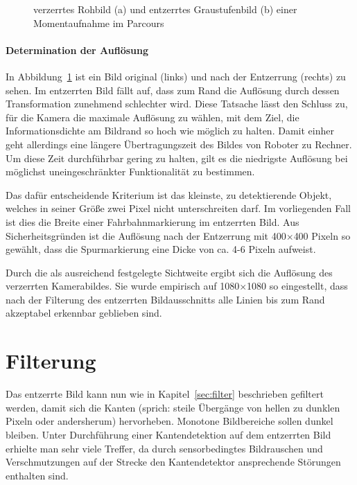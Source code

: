 \begin{figure}[htbp] %
  \centering
  \hfill
  \caption{verzerrtes Rohbild (a) und entzerrtes Graustufenbild (b) einer Momentaufnahme im Parcours}
\label{fig:bildvorverarbeitung_entzerren}
\end{figure} 

\paragraph{Determination der Auflösung}
In Abbildung~\ref{fig:bildvorverarbeitung_entzerren} ist ein Bild original (links) und nach der Entzerrung (rechts) zu sehen. Im entzerrten Bild fällt auf, dass zum Rand die Auflösung durch dessen Transformation zunehmend schlechter wird. Diese Tatsache lässt den Schluss zu, für die Kamera die maximale Auflösung zu wählen, mit dem Ziel, die Informationsdichte am Bildrand so hoch wie möglich zu halten. Damit einher geht allerdings eine längere Übertragungszeit des Bildes von Roboter zu Rechner. Um diese Zeit durchführbar gering zu halten, gilt es die niedrigste Auflösung bei möglichst uneingeschränkter Funktionalität zu bestimmen. 

Das dafür entscheidende Kriterium ist das kleinste, zu detektierende Objekt, welches in seiner Größe zwei Pixel nicht unterschreiten darf. Im vorliegenden Fall ist dies die Breite einer Fahrbahnmarkierung im entzerrten Bild. Aus Sicherheitsgründen ist die Auflösung nach der Entzerrung mit 400\( \times \)400 Pixeln so gewählt, dass die Spurmarkierung eine Dicke von ca. 4-6 Pixeln aufweist. 

Durch die als ausreichend festgelegte Sichtweite ergibt sich die Auflösung des verzerrten Kamerabildes. Sie wurde empirisch auf 1080\( \times \)1080 so eingestellt, dass nach der Filterung des entzerrten Bildausschnitts alle Linien bis zum Rand akzeptabel erkennbar geblieben sind.

\section{Filterung \dcfirstauthorshort}
\label{sec:bildvorverarbeitung:filterung}
Das entzerrte Bild kann nun wie in Kapitel~\ref{sec:filter} beschrieben gefiltert werden, damit sich die Kanten (sprich: steile Übergänge von hellen zu dunklen Pixeln oder andersherum) hervorheben. Monotone Bildbereiche sollen dunkel bleiben. Unter Durchführung einer Kantendetektion auf dem entzerrten Bild erhielte man sehr viele Treffer, da durch sensorbedingtes Bildrauschen und Verschmutzungen auf der Strecke den Kantendetektor ansprechende Störungen enthalten sind. 

